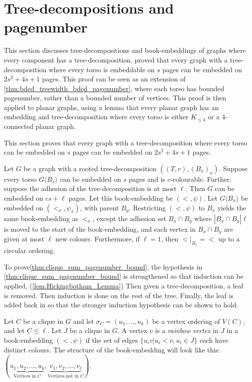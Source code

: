 \section{Tree-decompositions and pagenumber}\label{sec:BoundedPagenumber}
This section discusses tree-decompositions and book-embeddings of graphs where every component has a tree-decomposition. \textcite{hickingbothamStackNumberCliqueSum2023} proved that every graph with a tree-decomposition where every torso is embeddable on $s$ pages can be embedded on $2s^2 + 4s + 1$ pages. This proof can be seen as an extension of \cref{thm:bded_treewidth_bded_pagenumber}, where each torso has bounded pagenumber, rather than a bounded number of vertices. This proof is then applied to planar graphs, using a lemma that every planar graph has an embedding and tree-decomposition where every torso is either $K_{\leq 4}$ or a $4$-connected planar graph. 

This section proves that every graph with a tree-decomposition where every torso can be embedded on $s$ pages can be embedded on $2s^2 + 4s + 1$ pages. 

\begin{theorem}\label{thm:clique_sum_pagenumber_bound}
	Let \(G\) be a graph with a rooted tree-decomposition \(((T, r), (B_x)_x)\). Suppose every torso \(G \langle B_x \rangle\) can be embedded on \(s\) pages and is \(c\)-colourable. Further, suppose the adhesion of the tree-decomposition is at most \(\ell\).
	Then $G$ can be embedded on \( cs + \ell \) pages. Let this book-embedding be $(<, \psi)$. Let $G\langle B_x \rangle$ be embedded on $(<_x, \psi_x)$, with parent $B_y$. Restricting $(<, \psi)$ to $B_x$ yields the same book-embedding as $<_x$, except the adhesion set $B_x \cap B_y$ where $|B_x \cap B_y|\ell$ is moved to the start of the book-embedding, and each vertex in $B_x \cap B_y$ are given at most $\ell$ new colours. Furthermore, if $\ell = 1$, then $<|_{B_x} = <$ up to a circular ordering.
\end{theorem}

To prove\cref{thm:clique_sum_pagenumber_bound}, the hypothesis in \cref{thm:clique_sum_pagenumber_bound} is strengthened so that induction can be applied, (\cref{lem:Hickingbotham_Lemma}) Then given a tree-decomposition, a leaf is removed. Then induction is done on the rest of the tree. Finally, the leaf is added back in so that the stronger induction hypothesis can be shown to hold. 

Let \(C\) be a clique in \(G\) and let \(\sigma_C = (u_1, \ldots , u_k)\) be a vertex ordering of \(V(C)\), and let \(C \leq \ell \). Let $J$ be a clique in $G$. A vertex $v$ is a \textit{rainbow vertex} in $J$ in a book-embedding $(<, \psi)$ if the set of edges $\{u_i v | u_i < v, u_i \in J\}$ each have distinct colours. The structure of the book-embedding will look like this: \((\underbrace{u_1, u_2, \ldots, u_k}_{\text{Vertices in } C}, \underbrace{v_1, v_2, \ldots, v_l}_{\text{Vertices not in }C})\).

